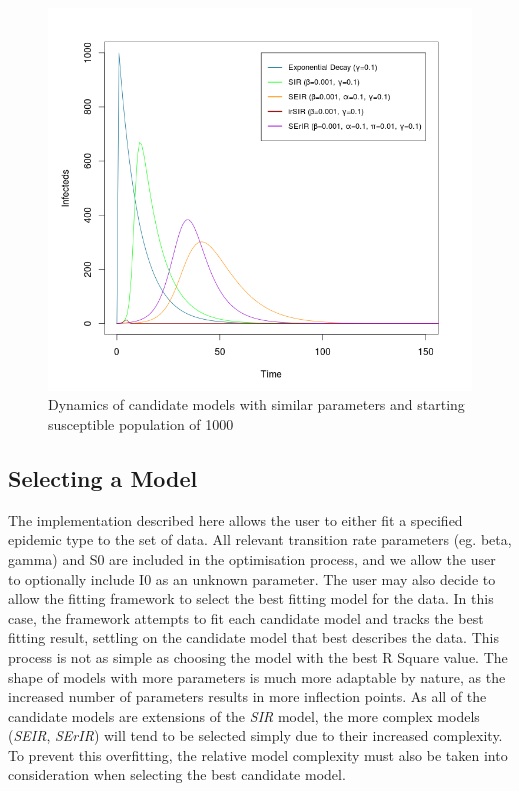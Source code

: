 \begin{figure}
\centering
\includegraphics[width=16cm]{images/candidates}
\caption{Dynamics of candidate models with similar parameters and
  starting susceptible population of 1000}
\label{figure:candidates}
\end{figure}

\subsection{Selecting a Model}
The implementation described here allows the user to either fit a
specified epidemic type to the set of data. All relevant
transition rate parameters (eg. beta, gamma) and S0 are included in the
optimisation process, and we allow the user to optionally include I0
as an unknown parameter. The user may also decide to allow the fitting
framework to select the best fitting model for the data. In this case,
the framework attempts to fit each candidate model and tracks the best
fitting result, settling on the candidate model that best describes
the data. This process is not as simple as choosing the model
with the best R Square value. The shape of models with more parameters
is much more adaptable by nature, as the increased number of
parameters results in more inflection points. As all of the candidate
models are extensions of the \emph{SIR} model, the more complex models
(\emph{SEIR}, \emph{SErIR}) will tend to be selected simply due to
their increased complexity. To prevent this overfitting, the relative
model complexity must also be taken into consideration when selecting the best candidate model.

